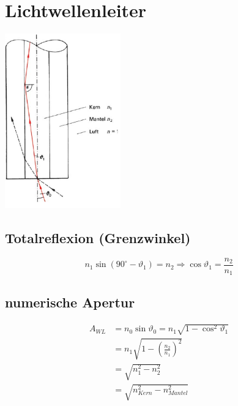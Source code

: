 \section{Lichtwellenleiter}
\begin{multicols}{2}
\begin{center}
 \includegraphics[width=50mm,keepaspectratio=true]{./Physik/Bilder/Lichtwellenleiter.png}
\end{center}

\subsection*{Totalreflexion (Grenzwinkel)}
\[n_1\sin\left(90^\circ-\vartheta_1\right)=n_2 \Longrightarrow \cos\vartheta_1=\frac{n_2}{n_1}\]

\subsection*{numerische Apertur}
\begin{align*}
 A_{WL}&=n_0 \sin\vartheta_0=n_1\sqrt{1-\cos^2\vartheta_1}\\&=n_1\sqrt{1-\left(\frac{n_2}{n_1}\right)^2}\\&=\sqrt{n_1^2-n_2^2}\\&=\sqrt{n_{Kern}^2-n_{Mantel}^2}
\end{align*}
\end{multicols}
